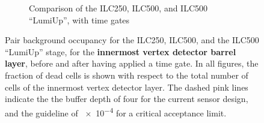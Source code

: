 \begin{figure}
\begin{subfigure}[t]{0.49\textwidth}
   \caption{Comparison of the ILC250, ILC500, and ILC500 ``LumiUp'', with time gates}
   \end{subfigure}
   \caption[Pair background occupancy in the \sid vertex detector for the ILC250, ILC500 and the ILC500 ``Lumi Up'' with time gates]{Pair background occupancy for the ILC250, ILC500, and the ILC500 ``LumiUp'' stage, for the \textbf{innermost \sid vertex detector barrel layer}, before and after having applied a time gate.
   In all figures, the fraction of dead cells is shown with respect to the total number of cells of the innermost vertex detector layer.
   The dashed pink lines indicate the the buffer depth of four for the current sensor design, and the guideline of \num{e-4} for a critical acceptance limit.
   }
   \label{fig:PairBkg:Timegate_Occupancy}
 \end{figure}
 
